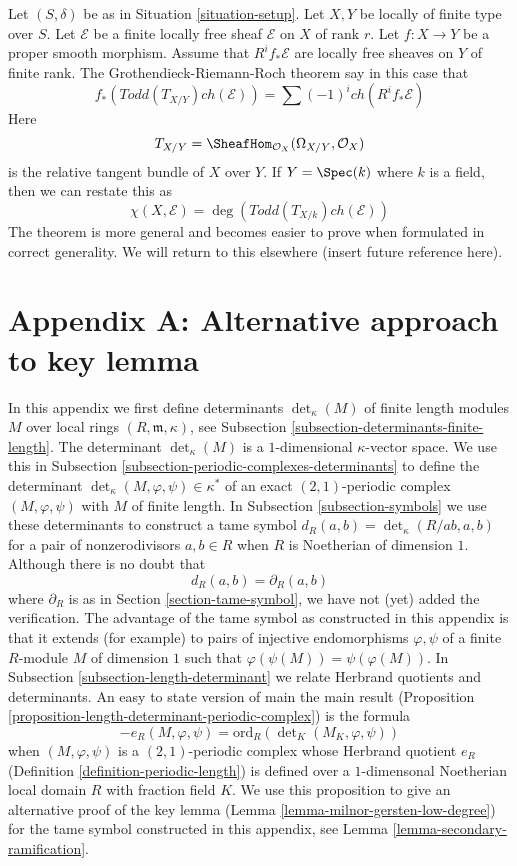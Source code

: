 \noindent
Let $(S, \delta)$ be as in
Situation \ref{situation-setup}.
Let $X, Y$ be locally of finite type over $S$.
Let $\mathcal{E}$ be a finite locally free sheaf
${\mathcal E}$ on $X$ of rank $r$.
Let $f : X \to Y$ be a proper smooth morphism.
Assume that $R^if_*\mathcal{E}$ are locally free
sheaves on $Y$ of finite rank.
The Grothendieck-Riemann-Roch theorem say in this
case that
$$
f_*(Todd(T_{X/Y}) ch(\mathcal{E}))
=
\sum (-1)^i ch(R^if_*\mathcal{E})
$$
Here
$$
T_{X/Y} = \SheafHom_{\mathcal{O}_X}(\Omega_{X/Y}, \mathcal{O}_X)
$$
is the relative tangent bundle of $X$ over $Y$. If $Y = \Spec(k)$
where $k$ is a field, then we can restate this as
$$
\chi(X, \mathcal{E}) = \deg(Todd(T_{X/k}) ch(\mathcal{E}))
$$
The theorem is more general and becomes easier to prove
when formulated in correct generality. We will return to
this elsewhere (insert future reference here).



\section{Appendix A: Alternative approach to key lemma}
\label{section-appendix-A}

\noindent
In this appendix we first define determinants $\det_\kappa(M)$
of finite length modules $M$ over local rings $(R, \mathfrak m, \kappa)$,
see Subsection \ref{subsection-determinants-finite-length}.
The determinant $\det_\kappa(M)$ is a $1$-dimensional $\kappa$-vector space.
We use this in Subsection \ref{subsection-periodic-complexes-determinants}
to define the determinant $\det_\kappa(M, \varphi, \psi) \in \kappa^*$
of an exact $(2, 1)$-periodic complex $(M, \varphi, \psi)$
with $M$ of finite length. In Subsection \ref{subsection-symbols}
we use these determinants to construct a tame symbol
$d_R(a, b) = \det_\kappa(R/ab, a, b)$ for a pair of nonzerodivisors
$a, b \in R$ when $R$ is Noetherian of dimension $1$.
Although there is no doubt that
$$
d_R(a, b) = \partial_R(a, b)
$$
where $\partial_R$ is as in Section \ref{section-tame-symbol},
we have not (yet) added the verification. The advantage of the
tame symbol as constructed in this appendix is that it extends
(for example) to pairs of injective endomorphisms $\varphi, \psi$
of a finite $R$-module $M$ of dimension $1$ such that
$\varphi(\psi(M)) = \psi(\varphi(M))$. In
Subsection \ref{subsection-length-determinant}
we relate Herbrand quotients and determinants.
An easy to state version of main the main result
(Proposition \ref{proposition-length-determinant-periodic-complex})
is the formula
$$
-e_R(M, \varphi, \psi) =
\text{ord}_R(\det\nolimits_K(M_K, \varphi, \psi))
$$
when $(M, \varphi, \psi)$ is a $(2, 1)$-periodic complex
whose Herbrand quotient $e_R$ (Definition \ref{definition-periodic-length})
is defined
over a $1$-dimensonal Noetherian local domain $R$ with fraction field $K$.
We use this proposition to give an alternative proof of the key lemma
(Lemma \ref{lemma-milnor-gersten-low-degree})
for the tame symbol constructed in this appendix, see
Lemma \ref{lemma-secondary-ramification}.


